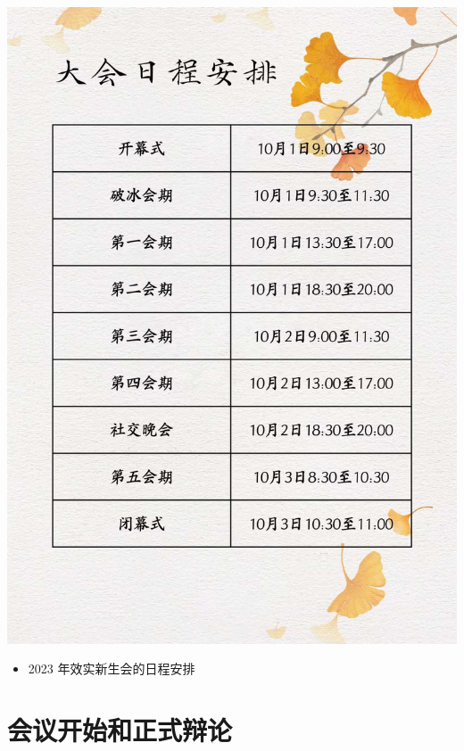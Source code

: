 \documentclass{beamer}
\begin{document}
\begin{frame}{}
    \begin{multicols}{2}
    \begin{center}\includegraphics[scale=0.08]{1.jpg}\end{center}\begin{tiny}\begin{itemize}\item[图 2] 2023 年效实新生会的日程安排\end{itemize}\end{tiny}
    \end{multicols}
\end{frame}

\section{会议开始和正式辩论}
\end{document}
